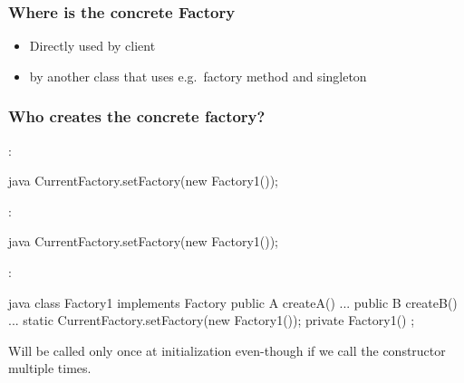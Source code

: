 \subsubsection{Where is the concrete Factory}
\begin{sectionbox}\nospacing
 \begin{itemize}
     \item Directly used by client
     \item by another class that uses e.g.\ factory method and singleton 
 \end{itemize} 
\subsubsection{Who creates the concrete factory?}
\end{sectionbox}
\begin{itemizenosep}
    \item {}:
  \begin{mintlinebox}{java}
		CurrentFactory.setFactory(new Factory1());
  \end{mintlinebox}
    \item {}:
  \begin{mintlinebox}{java}
		CurrentFactory.setFactory(new Factory1());
  \end{mintlinebox}
    \item {}:
  \begin{mintlinebox}{java}
		class Factory1 implements Factory {
      public A createA() { ... }
      public B createB() { ... }
      static {
        CurrentFactory.setFactory(new Factory1());
      }
      private Factory1() { };
    }
  \end{mintlinebox}
\end{itemizenosep}
\begin{defnbox}\nospacing
  \begin{defn}\label{defn:staticBlock}
    Will be called only once at initialization even-though if we call the
    constructor multiple times.
  \end{defn}
\end{defnbox}
